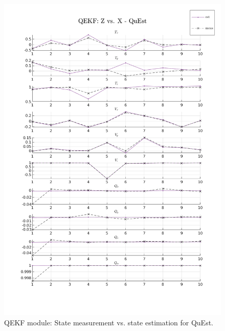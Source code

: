 \documentclass[11pt]{article}
\begin{document}
\begin{itemize}
    \begin{figure}[H]
      \begin{center}
        \includegraphics[width=\linewidth]{plt_qekf_log_ZvsX_QuEst.png}
      \end{center}
      \caption{QEKF module: State measurement vs. state estimation for QuEst.}
    \end{figure}


\end{itemize}
\end{document}
